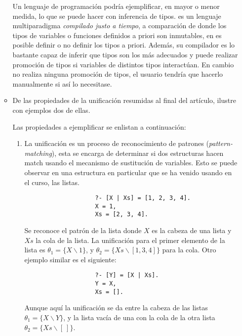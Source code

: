 \begin{enumerate}
\begin{itemize}
\begin{solution}
            Un lenguaje de programación podría ejemplificar, en mayor o menor medida, lo que se puede hacer con inferencia de tipos.  es un lenguaje multiparadigma \textit{compilado justo a tiempo}, a comparación de  donde los tipos de variables o funciones definidos a priori son inmutables, en  es posible definir o no definir los tipos a priori. Además, su compilador es lo bastante capaz de inferir que tipos son los más adecuados y puede realizar promoción de tipos si variables de distintos tipos interactúan. En cambio  no realiza ninguna promoción de tipos, el usuario tendría que hacerlo manualmente si así lo necesitase.
        \end{solution}
        \item De las propiedades de la unificación resumidas al final del artículo, ilustre con ejemplos dos de ellas.
        \begin{solution}
            Las propiedades a ejemplificar se enlistan a continuación:
            \begin{enumerate}
                \item La unificación es un proceso de reconocimiento de patrones (\textit{pattern-matching}), esta se encarga de determinar si dos estructuras hacen match usando el mecanismo de sustitución de variables. Esto se puede observar en una estructura en particular que se ha venido usando en el curso, las listas. 
                \begin{verbatim}
                    ?- [X | Xs] = [1, 2, 3, 4].
                    X = 1,
                    Xs = [2, 3, 4].
                \end{verbatim}
                Se reconoce el patrón de la lista \cite{lutz2015prolog} donde $X$ es la cabeza de una lista y $Xs$ la cola de la lista. La unificación para el primer elemento de la lista es $\theta_1 = \{X \backslash 1\}$, y $\theta_2 = \{Xs \backslash [1, 3, 4]\}$ para la cola. Otro ejemplo similar es el siguiente:
                \begin{verbatim}
                    ?- [Y] = [X | Xs].    
                    Y = X,
                    Xs = [].
                \end{verbatim}
                Aunque aquí la unificación se da entre la cabeza de las listas $\theta_1 = \{X \backslash Y\}$, y la lista vacía de una con la cola de la otra lista $\theta_2 = \{Xs\backslash [\ ]\}$.


\end{enumerate}
\end{solution}
\end{itemize}
\end{enumerate}
